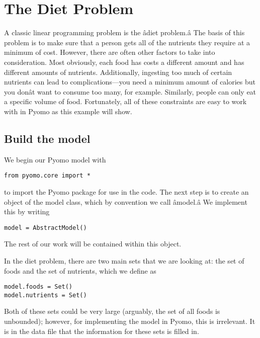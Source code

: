 \documentclass{article}
\begin{document}
\section*{The Diet Problem}

\hspace*{5mm}A classic linear programming problem is the âdiet problem.â The basis of this problem is to make sure that a person gets all of the nutrients they require at a minimum of cost.  However, there are often other factors to take into consideration.  Most obviously, each food has costs a different amount and has different amounts of nutrients.  Additionally, ingesting too much of certain nutrients can lead to complications---you need a minimum amount of calories but you donât want to consume too many, for example.  Similarly, people can only eat a specific volume of food.  Fortunately, all of these constraints are easy to work with in Pyomo as this example will show.

\subsection*{Build the model}

\hspace*{5mm}We begin our Pyomo model with

\begin{verbatim}
from pyomo.core import *
\end{verbatim}

\noindent
to import the Pyomo package for use in the code.  The next step is to create an object of the model class, which by convention we call âmodel.â  We implement this by writing

\begin{verbatim}model = AbstractModel() \end{verbatim}

\noindent
The rest of our work will be contained within this object.

In the diet problem, there are two main sets that we are looking at: the set of foods and the set of nutrients, which we define as

\begin{verbatim}model.foods = Set()
model.nutrients = Set()\end{verbatim}

Both of these sets could be very large (arguably, the set of all foods is unbounded); however, for implementing the model in Pyomo, this is irrelevant.  It is in the data file that the information for these sets is filled in.
\end{document}
